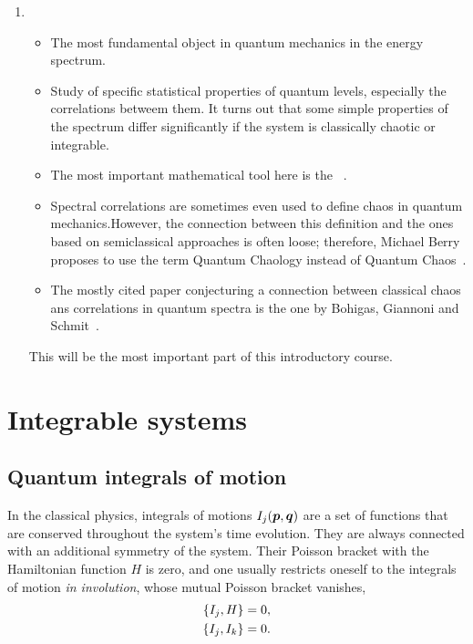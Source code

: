 \documentclass[a4paper,11pt,twoside]{article}
\begin{document}
\begin{enumerate}
                \item {}
                    \begin{itemize}
                        \item The most fundamental object in quantum mechanics in the energy spectrum.
                        \item Study of specific statistical properties of quantum levels, especially the correlations betweem them.
                        It turns out that some simple properties of the spectrum differ significantly if the system is classically chaotic or integrable.
                        \item The most important mathematical tool here is the ~\cite{Meh04}.
                        \item Spectral correlations are sometimes even used to define chaos in quantum mechanics.How\-ever, the connection between this definition and the ones based on semiclassical approaches is often loose; therefore, Michael Berry proposes to use the term Quantum Chaology instead of Quantum Chaos~\cite{Ber89}.
                        \item The mostly cited paper conjecturing a connection between classical chaos ans correlations in quantum spectra is the one by Bohigas, Giannoni and Schmit~\cite{Boh84}.
                    \end{itemize}
                    This will be the most important part of this introductory course.
        \end{enumerate}

\section{Integrable systems}\label{sec:Integrable}
    \subsection{Quantum integrals of motion}
        In the classical physics, integrals of motions $I_j(\boldsymbol{p},\boldsymbol{q})$ are a set of functions that are conserved throughout the system's time evolution.
        They are always connected with an additional symmetry of the system.
        Their Poisson bracket with the Hamiltonian function $H$ is zero, and one usually restricts oneself to the integrals of motion \emph{in involution}, whose mutual Poisson bracket vanishes,
        \begin{align}
            \left\{{I_{j}},{H}\right\}=0,\nonumber\\
            \left\{{I_{j}},{I_{k}}\right\}=0.
        \end{align}
        
\end{document}
